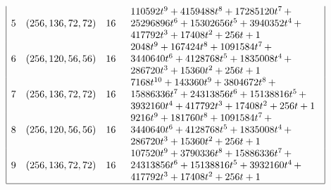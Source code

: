 \documentclass[12pt,a4paper]{article}
\begin{document}
\begin{table}[!bhpt]
\begin{align*}
\begin{array}{|cccl|}
5 &
(256, 136, 72, 72) &
16 &
\begin{array}{l}
110592t^{9} + 4159488t^{8} + 17285120t^{7}
\,+
\\
 25296896t^{6} + 15302656t^{5} + 3940352t^{4}
\,+
\\
 417792t^{3} + 17408t^{2} + 256t + 1
\end{array}
\\
6 &
(256, 120, 56, 56) &
16 &
\begin{array}{l}
2048t^{9} + 167424t^{8} + 1091584t^{7}
\,+
\\
 3440640t^{6} + 4128768t^{5} + 1835008t^{4}
\,+
\\
 286720t^{3} + 15360t^{2} + 256t + 1
\end{array}
\\
7 &
(256, 136, 72, 72) &
16 &
\begin{array}{l}
7168t^{10} + 143360t^{9} + 3804672t^{8}
\,+
\\
 15886336t^{7} + 24313856t^{6} + 15138816t^{5}
\,+
\\
 3932160t^{4} + 417792t^{3} + 17408t^{2} + 256t + 1
\end{array}
\\
8 &
(256, 120, 56, 56) &
16 &
\begin{array}{l}
9216t^{9} + 181760t^{8} + 1091584t^{7}
\,+
\\
 3440640t^{6} + 4128768t^{5} + 1835008t^{4}
\,+
\\
 286720t^{3} + 15360t^{2} + 256t + 1
\end{array}
\\
9 &
(256, 136, 72, 72) &
16 &
\begin{array}{l}
107520t^{9} + 3790336t^{8} + 15886336t^{7}
\,+
\\
 24313856t^{6} + 15138816t^{5} + 3932160t^{4}
\,+
\\
 417792t^{3} + 17408t^{2} + 256t + 1
\end{array}
\\
\hline
\end{array}
\end{align*}
\caption{$[f_{8,10}]$ extended Cayley classes.}
\label{tab-c8_10_EC_classes}
\end{table}
\end{document}
